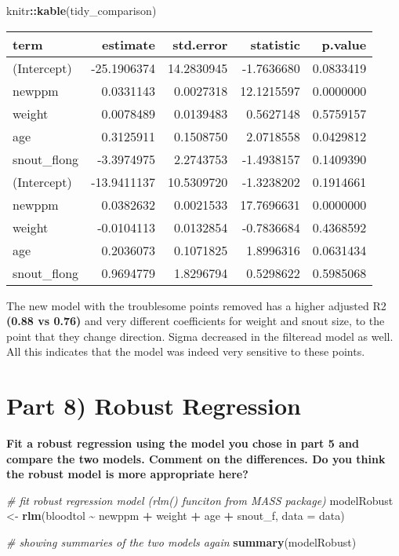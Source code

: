 \documentclass[
]{article}
\newenvironment{Shaded}{\begin{snugshade}}{\end{snugshade}}
\newcommand{\AttributeTok}[1]{\textcolor[rgb]{0.13,0.29,0.53}{#1}}
\newcommand{\CommentTok}[1]{\textcolor[rgb]{0.56,0.35,0.01}{\textit{#1}}}
\newcommand{\FunctionTok}[1]{\textcolor[rgb]{0.13,0.29,0.53}{\textbf{#1}}}
\newcommand{\NormalTok}[1]{#1}
\newcommand{\OtherTok}[1]{\textcolor[rgb]{0.56,0.35,0.01}{#1}}
\newcommand{\SpecialCharTok}[1]{\textcolor[rgb]{0.81,0.36,0.00}{\textbf{#1}}}
\begin{document}
\begin{Shaded}
\begin{Highlighting}[]
\NormalTok{knitr}\SpecialCharTok{::}\FunctionTok{kable}\NormalTok{(tidy\_comparison)}
\end{Highlighting}
\end{Shaded}

\begin{longtable}[]{@{}lrrrr@{}}
\toprule\noalign{}
term & estimate & std.error & statistic & p.value \\
\midrule\noalign{}
\endhead
\bottomrule\noalign{}
\endlastfoot
(Intercept) & -25.1906374 & 14.2830945 & -1.7636680 & 0.0833419 \\
newppm & 0.0331143 & 0.0027318 & 12.1215597 & 0.0000000 \\
weight & 0.0078489 & 0.0139483 & 0.5627148 & 0.5759157 \\
age & 0.3125911 & 0.1508750 & 2.0718558 & 0.0429812 \\
snout\_flong & -3.3974975 & 2.2743753 & -1.4938157 & 0.1409390 \\
(Intercept) & -13.9411137 & 10.5309720 & -1.3238202 & 0.1914661 \\
newppm & 0.0382632 & 0.0021533 & 17.7696631 & 0.0000000 \\
weight & -0.0104113 & 0.0132854 & -0.7836684 & 0.4368592 \\
age & 0.2036073 & 0.1071825 & 1.8996316 & 0.0631434 \\
snout\_flong & 0.9694779 & 1.8296794 & 0.5298622 & 0.5985068 \\
\end{longtable}

The new model with the troublesome points removed has a higher adjusted
R2 \textbf{(0.88 vs 0.76)} and very different coefficients for weight
and snout size, to the point that they change direction. Sigma decreased
in the filteread model as well. All this indicates that the model was
indeed very sensitive to these points.

\section{Part 8) Robust Regression}\label{part-8-robust-regression}

\textbf{Fit a robust regression using the model you chose in part 5 and
compare the two models. Comment on the differences. Do you think the
robust model is more appropriate here?}

\begin{Shaded}
\begin{Highlighting}[]
\CommentTok{\# fit robust regression model (rlm() funciton from \textasciigrave{}MASS\textasciigrave{} package)}
\NormalTok{modelRobust }\OtherTok{\textless{}{-}} \FunctionTok{rlm}\NormalTok{(bloodtol }\SpecialCharTok{\textasciitilde{}}\NormalTok{ newppm }\SpecialCharTok{+}\NormalTok{ weight }\SpecialCharTok{+}\NormalTok{ age }\SpecialCharTok{+}\NormalTok{ snout\_f, }\AttributeTok{data =}\NormalTok{ data)}

\CommentTok{\# showing summaries of the two models again}
\FunctionTok{summary}\NormalTok{(modelRobust)}
\end{Highlighting}
\end{Shaded}
\end{document}
